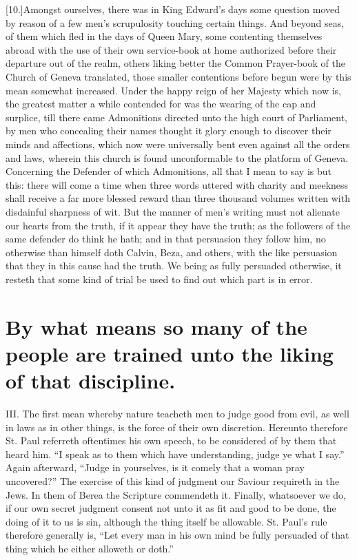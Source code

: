 [10.]Amongst ourselves, there was in King Edward’s days some question moved by reason of a few men’s scrupulosity touching certain things. And beyond seas, of them which fled in the days of Queen Mary, some contenting themselves abroad with the use of their own service-book at home authorized before their departure out of the realm, others liking better the Common Prayer-book of the Church of Geneva translated, those smaller contentions before begun were by this mean somewhat increased. Under the happy reign of her Majesty which now is, the greatest matter a while contended for was the wearing of the cap and surplice, till there came Admonitions directed unto the high court of Parliament, by men who concealing their names thought it glory enough to discover their minds and affections, which now were universally bent even against all the orders and laws, wherein this church is found unconformable to the platform of Geneva. Concerning the Defender of which Admonitions, all that I mean to say is but this: there will come a time when three words uttered with charity and meekness shall receive a far more blessed reward than three thousand volumes written with disdainful sharpness of wit. But the manner of men’s writing must not alienate our hearts from the truth, if it appear they have the truth; as the followers of the same defender do think he hath; and in that persuasion they follow him, no otherwise than himself doth Calvin, Beza, and others, with the like persuasion that they in this cause had the truth. We being as fully persuaded otherwise, it resteth that some kind of trial be used to find out which part is in error.

\section*{By what means so many of the people are trained unto the liking of that discipline.}

III. The first mean whereby nature teacheth men to judge good from evil, as well in laws as in other things, is the force of their own discretion. Hereunto therefore St. Paul referreth oftentimes his own speech, to be considered of by them that heard him. “I speak as to them which have understanding, judge ye what I say.” Again afterward, “Judge in yourselves, is it comely that a woman pray uncovered?” The exercise of this kind of judgment our Saviour requireth in the Jews. In them of Berea the Scripture commendeth it. Finally, whatsoever we do, if our own secret judgment consent not unto it as fit and good to be done, the doing of it to us is sin, although the thing itself be allowable. St. Paul’s rule therefore generally is, “Let every man in his own mind be fully persuaded of that thing which he either alloweth or doth.”

